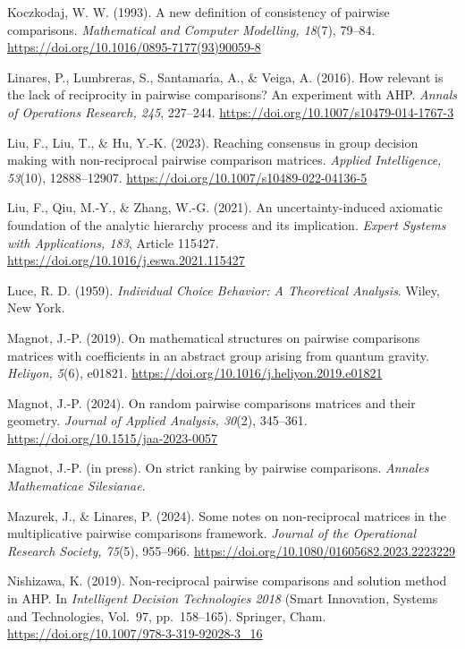\documentclass[11pt]{amsart}
\theoremstyle{definition}
\theoremstyle{plain}
\numberwithin{equation}{section}
\begin{document}
\begin{thebibliography}{}
Koczkodaj, W. W. (1993).
A new definition of consistency of pairwise comparisons.
\textit{Mathematical and Computer Modelling, 18}(7), 79--84.
\url{https://doi.org/10.1016/0895-7177(93)90059-8}

Linares, P., Lumbreras, S., Santamar\'{\i}a, A., \& Veiga, A. (2016).
How relevant is the lack of reciprocity in pairwise comparisons? An experiment with AHP.
\textit{Annals of Operations Research, 245}, 227--244.
\url{https://doi.org/10.1007/s10479-014-1767-3}

Liu, F., Liu, T., \& Hu, Y.-K. (2023).
Reaching consensus in group decision making with non-reciprocal pairwise comparison matrices.
\textit{Applied Intelligence, 53}(10), 12888--12907.
\url{https://doi.org/10.1007/s10489-022-04136-5}

Liu, F., Qiu, M.-Y., \& Zhang, W.-G. (2021).
An uncertainty-induced axiomatic foundation of the analytic hierarchy process and its implication.
\textit{Expert Systems with Applications, 183}, Article 115427.
\url{https://doi.org/10.1016/j.eswa.2021.115427}

Luce, R. D. (1959).
\textit{Individual Choice Behavior: A Theoretical Analysis}.
Wiley, New York.

Magnot, J.-P. (2019).
On mathematical structures on pairwise comparisons matrices with coefficients in an abstract group arising from quantum gravity.
\textit{Heliyon, 5}(6), e01821.
\url{https://doi.org/10.1016/j.heliyon.2019.e01821}

Magnot, J.-P. (2024).
On random pairwise comparisons matrices and their geometry.
\textit{Journal of Applied Analysis, 30}(2), 345--361.
\url{https://doi.org/10.1515/jaa-2023-0057}

Magnot, J.-P. (in press).
On strict ranking by pairwise comparisons.
\textit{Annales Mathematicae Silesianae}.

Mazurek, J., \& Linares, P. (2024).
Some notes on non-reciprocal matrices in the multiplicative pairwise comparisons framework.
\textit{Journal of the Operational Research Society, 75}(5), 955--966.
\url{https://doi.org/10.1080/01605682.2023.2223229}

Nishizawa, K. (2019).
Non-reciprocal pairwise comparisons and solution method in AHP.
In \textit{Intelligent Decision Technologies 2018}
(Smart Innovation, Systems and Technologies, Vol.~97, pp.~158--165).
Springer, Cham.
\url{https://doi.org/10.1007/978-3-319-92028-3_16}


\end{thebibliography}
\end{document}
